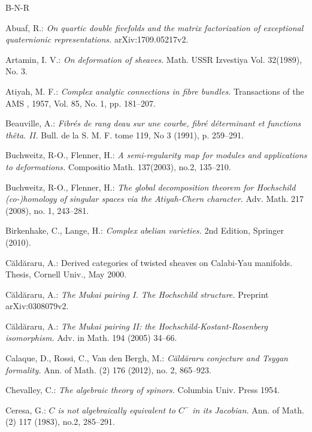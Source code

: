 \documentclass[12pt]{amsart}
\numberwithin{equation}{subsection}
\theoremstyle{plain}
\theoremstyle{definition}
\begin{document}
\begin{thebibliography}{B-N-R}

 Abuaf, R.:
{\em On quartic double fivefolds and the matrix factorization of exceptional quaternionic representations.\/} arXiv:1709.05217v2.

 Artamin, I. V.: {\em On deformation of sheaves.\/} Math. USSR Izvestiya Vol. 32(1989), No. 3.

 Atiyah, M. F.: {\em Complex analytic connections in fibre bundles.\/}
Transactions of the AMS , 1957, Vol. 85, No. 1, pp. 181--207.

 Beauville, A.: {\em Fibr\'{e}s de rang deau sur une courbe, fibr\'{e} d\'{e}terminant et functions th\^{e}ta. II.\/}
Bull. de la S. M. F. tome 119, No 3 (1991), p. 259--291.

 Buchweitz, R-O., Flenner, H.: {\em A semi-regularity map for modules and applications to deformations.\/} Compositio Math. 137(2003), no.2, 135--210.

 Buchweitz, R-O., Flenner, H.: {\em The global decomposition theorem for Hochschild (co-)homology of singular spaces via the Atiyah-Chern character.\/} Adv. Math.   217 (2008), no. 1, 243--281.

 Birkenhake, C., Lange, H.: {\em Complex abelian varieties.\/} 2nd Edition, Springer (2010). 


 C\u{a}ld\u{a}raru, A.:
{Derived categories of twisted sheaves on
Calabi-Yau manifolds.\/} Thesis, Cornell Univ., May 2000.


 C\u{a}ld\u{a}raru, A.:
{\em The Mukai pairing I. The Hochschild structure.\/} Preprint arXiv:0308079v2.

 C\u{a}ld\u{a}raru, A.:
{\em The Mukai pairing II: the Hochschild-Kostant-Rosenberg isomorphism. \/}
Adv. in Math. 194 (2005) 34--66.



 Calaque, D., Rossi, C., Van den Bergh, M.:
{\em C\u{a}ld\u{a}raru conjecture and Tsygan formality.\/} Ann. of Math. (2) 176 (2012), no. 2, 865--923. 

 Chevalley, C.:
{\em The algebraic theory of spinors.\/}
Columbia Univ. Press 1954.

 Ceresa, G.: {\em $C$ is not algebraically equivalent to $C^{-}$ in its  Jacobian.\/} Ann. of Math. (2)  117  (1983), no.2, 285--291.


\end{thebibliography}
\end{document}
